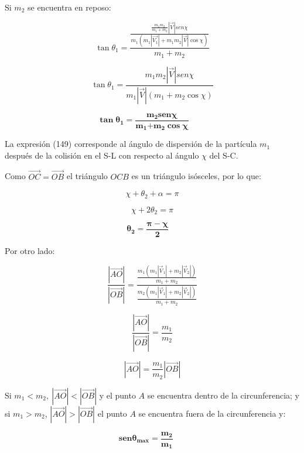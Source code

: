 \documentclass[]{article}
\begin{document}
Si \(m_{2}\) se encuentra en reposo:

\[\tan\theta_{1} = \frac{\frac{\frac{m_{1}m_{2}}{m_{1} + m_{2}}\left| \overrightarrow{V} \right|sen\chi}{m_{1}\left( m_{1}\left| \overrightarrow{V_{1}} \right| + m_{1}m_{2}\left| \overrightarrow{V} \right|\cos\chi \right)}}{m_{1} + m_{2}}\]

\[\tan\theta_{1} = \frac{m_{1}m_{2}\left| \overrightarrow{V} \right|sen\chi}{m_{1}\left| \overrightarrow{V} \right|\left( m_{1} + m_{2}\cos\chi \right)}\]

\[\mathbf{\tan}\mathbf{\theta}_{\mathbf{1}}\mathbf{=}\frac{\mathbf{m}_{\mathbf{2}}\mathbf{sen\chi}}{\mathbf{m}_{\mathbf{1}}\mathbf{+}\mathbf{m}_{\mathbf{2}}\mathbf{\cos}\mathbf{\chi}}\mathbf{\ \ \ \ \ \ \ \ \ \ }\]

La expresión (149) corresponde al ángulo de dispersión de la partícula
\(m_{1}\) después de la colisión en el S-L con respecto al ángulo
\(\chi\) del S-C.

Como \(\overrightarrow{OC} = \overrightarrow{OB}\) el triángulo \(OCB\)
es un triángulo isósceles, por lo que:

\[\chi + \theta_{2} + \alpha = \pi\]

\[\chi + 2\theta_{2} = \pi\]

\[\mathbf{\theta}_{\mathbf{2}}\mathbf{=}\frac{\mathbf{\pi - \chi}}{\mathbf{2}}\mathbf{\ \ \ \ \ }\]

Por otro lado:

\[\frac{\left| \overrightarrow{AO} \right|}{\left| \overrightarrow{OB} \right|} = \frac{\frac{m_{1}\left( m_{1}\left| {\overrightarrow{V}}_{1} \right| + m_{2}\left| {\overrightarrow{V}}_{2} \right| \right)}{m_{1} + m_{2}}}{\frac{m_{2}\left( m_{1}\left| {\overrightarrow{V}}_{1} \right| + m_{2}\left| {\overrightarrow{V}}_{2} \right| \right)}{m_{1} + m_{2}}}\]

\[\frac{\left| \overrightarrow{AO} \right|}{\left| \overrightarrow{OB} \right|} = \frac{m_{1}}{m_{2}}\]

\[\left| \overrightarrow{AO} \right| = \frac{m_{1}}{m_{2}}\left| \overrightarrow{OB} \right|\]

Si
\(m_{1} < m_{2},\ \left| \overrightarrow{AO} \right| < \left| \overrightarrow{OB} \right|\)
y el punto \(A\) se encuentra dentro de la circunferencia; y si
\(m_{1} > m_{2}\),
\(\left| \overrightarrow{AO} \right| > \left| \overrightarrow{OB} \right|\)
el punto \(A\) se encuentra fuera de la circunferencia y:

\[\mathbf{sen}\mathbf{\theta}_{\mathbf{\max}}\mathbf{=}\frac{\mathbf{m}_{\mathbf{2}}}{\mathbf{m}_{\mathbf{1}}}\mathbf{\ \ \ \ \ \ \ }\]
\end{document}
